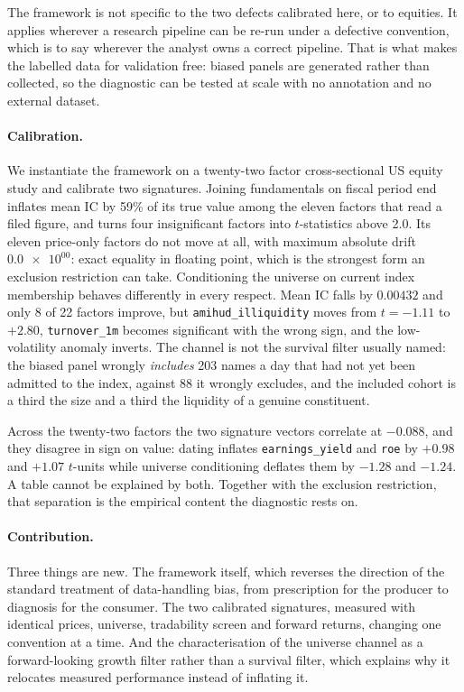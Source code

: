 \documentclass[11pt]{article}
\newcommand{\fac}[1]{\texttt{\small #1}}
\begin{document}
The framework is not specific to the two defects calibrated here, or to equities. It
applies wherever a research pipeline can be re-run under a defective convention, which is
to say wherever the analyst owns a correct pipeline. That is what makes the labelled data
for validation free: biased panels are generated rather than collected, so the diagnostic
can be tested at scale with no annotation and no external dataset.

\paragraph{Calibration.} We instantiate the framework on a twenty-two factor
cross-sectional US equity study and calibrate two signatures. Joining fundamentals on
fiscal period end inflates mean IC by 59\% of its true value among the eleven factors that
read a filed figure, and turns four insignificant factors into $t$-statistics above 2.0.
Its eleven price-only factors do not move at all, with maximum absolute drift
$\num{0.0e+00}$: exact equality in floating point, which is the strongest form an
exclusion restriction can take. Conditioning the universe on current index membership
behaves differently in every respect. Mean IC falls by $0.00432$ and only 8 of 22 factors
improve, but \fac{amihud\_illiquidity} moves from $t = -1.11$ to $+2.80$,
\fac{turnover\_1m} becomes significant with the wrong sign, and the low-volatility anomaly
inverts. The channel is not the survival filter usually named: the biased panel wrongly
\emph{includes} 203 names a day that had not yet been admitted to the index, against 88 it
wrongly excludes, and the included cohort is a third the size and a third the liquidity of
a genuine constituent.

Across the twenty-two factors the two signature vectors correlate at $-0.088$, and they
disagree in sign on value: dating inflates \fac{earnings\_yield} and \fac{roe} by $+0.98$
and $+1.07$ $t$-units while universe conditioning deflates them by $-1.28$ and $-1.24$. A
table cannot be explained by both. Together with the exclusion restriction, that
separation is the empirical content the diagnostic rests on.

\paragraph{Contribution.} Three things are new. The framework itself, which reverses the
direction of the standard treatment of data-handling bias, from prescription for the
producer to diagnosis for the consumer. The two calibrated signatures, measured with
identical prices, universe, tradability screen and forward returns, changing one
convention at a time. And the characterisation of the universe channel as a
forward-looking growth filter rather than a survival filter, which explains why it
relocates measured performance instead of inflating it.
\end{document}
